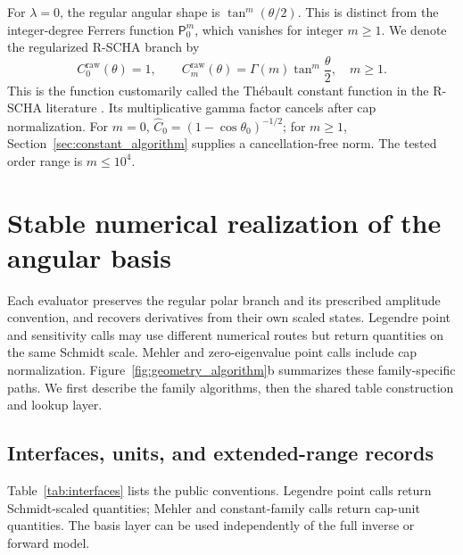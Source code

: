 ﻿\documentclass[11pt,a4paper]{article}
\newcommand{\RSCHA}{\textsc{R-SCHA}\xspace}
\begin{document}
For $\lambda=0$, the regular angular shape is $\tan^m(\theta/2)$. This is distinct from the integer-degree Ferrers function $\mathsf P_0^m$, which vanishes for integer $m\geq1$. We denote the regularized \RSCHA branch by
\begin{equation}
 C_0^{\mathrm{raw}}(\theta)=1,
 \qquad C_m^{\mathrm{raw}}(\theta)=\Gamma(m)\tan^m\frac{\theta}{2},
 \quad m\geq1.
 \label{eq:constant_raw}
\end{equation}
This is the function customarily called the Th\'ebault constant function in the \RSCHA literature \citep{ThebaultEtAl2004,ThebaultEtAl2006}. Its multiplicative gamma factor cancels after cap normalization. For $m=0$, $\widehat C_0=(1-\cos\theta_0)^{-1/2}$; for $m\geq1$, Section~\ref{sec:constant_algorithm} supplies a cancellation-free norm. The tested order range is $m\leq10^4$.

\section{Stable numerical realization of the angular basis}
\label{sec:algorithms}

Each evaluator preserves the regular polar branch and its prescribed amplitude convention, and recovers derivatives from their own scaled states. Legendre point and sensitivity calls may use different numerical routes but return quantities on the same Schmidt scale. Mehler and zero-eigenvalue point calls include cap normalization. Figure~\ref{fig:geometry_algorithm}b summarizes these family-specific paths. We first describe the family algorithms, then the shared table construction and lookup layer.

\subsection{Interfaces, units, and extended-range records}
\label{sec:interfaces}

Table~\ref{tab:interfaces} lists the public conventions. Legendre point calls return Schmidt-scaled quantities; Mehler and constant-family calls return cap-unit quantities. The basis layer can be used independently of the full inverse or forward model.
\end{document}
